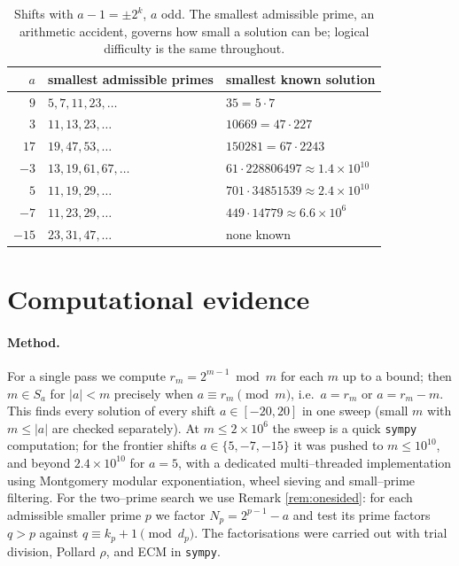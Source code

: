 \documentclass[11pt,reqno]{amsart}
\theoremstyle{plain}
\theoremstyle{definition}
\theoremstyle{remark}
\newcommand{\Sa}{S_a}
\begin{document}
\begin{table}[H]
\centering
\begin{tabular}{rl l}
\toprule
$a$ & smallest admissible primes & smallest known solution\\
\midrule
$9$ & $5,7,11,23,\dots$ & $35=5\cdot7$\\
$3$ & $11,13,23,\dots$ & $10669=47\cdot227$\\
$17$ & $19,47,53,\dots$ & $150281=67\cdot2243$\\
$-3$ & $13,19,61,67,\dots$ & $61\cdot228806497\approx1.4\times10^{10}$\\
$5$ & $11,19,29,\dots$ & $701\cdot34851539\approx2.4\times10^{10}$\\
$-7$ & $11,23,29,\dots$ & $449\cdot14779\approx6.6\times10^{6}$\\
$-15$ & $23,31,47,\dots$ & none known\\
\bottomrule
\end{tabular}
\caption{Shifts with $a-1=\pm2^{k}$, $a$ odd. The smallest admissible prime, an arithmetic accident, governs how small a solution can be; logical difficulty is the same throughout.}
\label{tab:smallest}
\end{table}

\section{Computational evidence}\label{sec:computation}

\paragraph{Method.} For a single pass we compute $r_m=2^{m-1}\bmod m$ for each $m$ up to a bound; then $m\in\Sa$ for $|a|<m$ precisely when $a\equiv r_m\pmod m$, i.e.\ $a=r_m$ or $a=r_m-m$. This finds every solution of every shift $a\in[-20,20]$ in one sweep (small $m$ with $m\le|a|$ are checked separately). At $m\le2\times10^{6}$ the sweep is a quick \texttt{sympy} computation; for the frontier shifts $a\in\{5,-7,-15\}$ it was pushed to $m\le10^{10}$, and beyond $2.4\times10^{10}$ for $a=5$, with a dedicated multi--threaded implementation using Montgomery modular exponentiation, wheel sieving and small--prime filtering. For the two--prime search we use Remark \ref{rem:onesided}: for each admissible smaller prime $p$ we factor $N_p=2^{p-1}-a$ and test its prime factors $q>p$ against $q\equiv k_p+1\pmod{d_p}$. The factorisations were carried out with trial division, Pollard $\rho$, and ECM in \texttt{sympy}.
\end{document}
